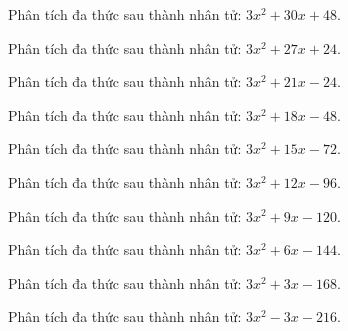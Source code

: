 \begin{bt}
	Phân tích đa thức sau thành nhân tử: $3 x^2 + 30 x + 48$.
\end{bt}
\begin{bt}
	Phân tích đa thức sau thành nhân tử: $3 x^2 + 27 x + 24$.
\end{bt}
\begin{bt}
	Phân tích đa thức sau thành nhân tử: $3 x^2 + 21 x - 24$.
\end{bt}
\begin{bt}
	Phân tích đa thức sau thành nhân tử: $3 x^2 + 18 x - 48$.
\end{bt}
\begin{bt}
	Phân tích đa thức sau thành nhân tử: $3 x^2 + 15 x - 72$.
\end{bt}
\begin{bt}
	Phân tích đa thức sau thành nhân tử: $3 x^2 + 12 x - 96$.
\end{bt}
\begin{bt}
	Phân tích đa thức sau thành nhân tử: $3 x^2 + 9 x - 120$.
\end{bt}
\begin{bt}
	Phân tích đa thức sau thành nhân tử: $3 x^2 + 6 x - 144$.
\end{bt}
\begin{bt}
	Phân tích đa thức sau thành nhân tử: $3 x^2 + 3 x - 168$.
\end{bt}
\begin{bt}
	Phân tích đa thức sau thành nhân tử: $3 x^2 - 3 x - 216$.
\end{bt}
